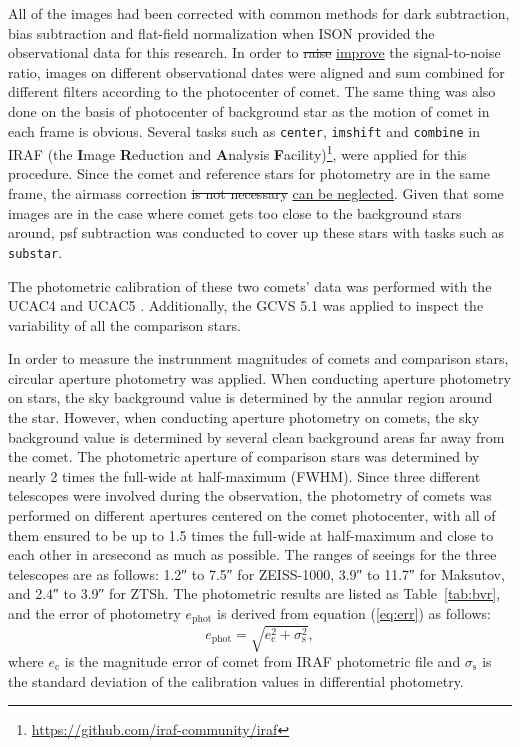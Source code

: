 All of the images had been corrected with common methods for dark subtraction, bias subtraction and flat-field normalization when ISON provided the observational data for this research. In order to \st{raise} \ul{improve} the signal-to-noise ratio, images on different observational dates were aligned and sum combined for different filters according to the photocenter of comet. The same thing was also done on the basis of photocenter of background star as the motion of comet in each frame is obvious. Several tasks such as \texttt{center}, \texttt{imshift} and \texttt{combine} in IRAF (the \textbf{I}mage \textbf{R}eduction and \textbf{A}nalysis \textbf{F}acility)\footnote{\url{https://github.com/iraf-community/iraf}}, were applied for this procedure. Since the comet and reference stars for photometry are in the same frame, the airmass correction \st{is not necessary} \ul{can be neglected}. Given that some images are in the case where comet gets too close to the background stars around, psf subtraction was conducted to cover up these stars with tasks such as \verb|substar|. 

The photometric calibration of these two comets' data was performed with the UCAC4 \citep{zacharias_fourth_2013} and UCAC5 \citep{zacharias_ucac5_2017}. Additionally, the GCVS 5.1 \citep{samus_general_2017} was applied to inspect the variability of all the comparison stars. 

In order to measure the  instrunment magnitudes of comets and comparison stars, circular aperture photometry was applied. When conducting aperture photometry on stars, the sky background value is determined by the annular region around the star. However, when conducting aperture photometry on comets, the sky background value is determined by several clean background areas far away from the comet. The photometric aperture of comparison stars was determined by nearly \si{\num{2}} times the full-wide at half-maximum (FWHM). Since three different telescopes were involved during the observation, the photometry of comets was performed on different apertures centered on the comet photocenter, with all of them ensured to be up to \si{\num{1.5}} times the full-wide at half-maximum and close to each other in arcsecond as much as possible. 
The ranges of seeings for the three telescopes are as follows: \ang{;;1.2} to \ang{;;7.5} for ZEISS-1000, \ang{;;3.9} to \ang{;;11.7} for Maksutov, and \ang{;;2.4} to \ang{;;3.9} for ZTSh. 
The photometric results are listed as Table~\ref{tab:bvr}, and the error of photometry $e_{\mathrm{phot}}$ is derived from equation (\ref{eq:err}) as follows: 
\begin{equation}
    e_{\mathrm{phot}} = \sqrt{e_{\mathrm{c}}^{2} + \sigma_\mathrm{s}^2}, 
    \label{eq:err}
\end{equation}
where $e_\mathrm{c}$ is the magnitude error of comet from IRAF photometric file and $\sigma_\mathrm{s}$ is the standard deviation of the calibration values in differential photometry. 






